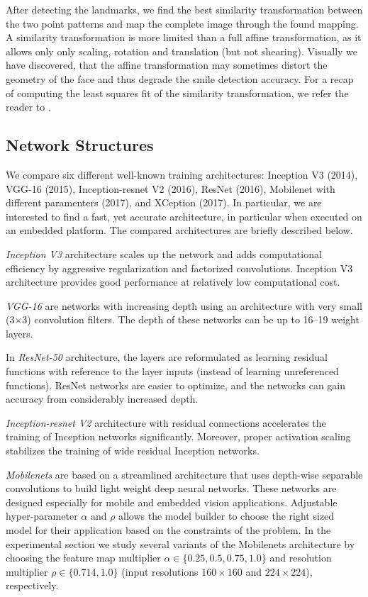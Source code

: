 \documentclass[conference]{IEEEtran}
\begin{document}
After detecting the landmarks, we find the best similarity transformation between the two point patterns and map the complete image through the found mapping. A similarity transformation is more limited than a full affine transformation, as it allows only only scaling, rotation and translation (but not shearing). Visually we have discovered, that the affine transformation may sometimes distort the geometry of the face and thus degrade the smile detection accuracy. For a recap of computing the least squares fit of the similarity transformation, we refer the reader to \cite{bai2018}.


\subsection{Network Structures}

We compare six different well-known training architectures: Inception V3 (2014), VGG-16 (2015), Inception-resnet V2 (2016), ResNet (2016), Mobilenet with different paramenters (2017), and XCeption (2017). In particular, we are interested to find a fast, yet accurate architecture, in particular when executed on an embedded platform. The compared architectures are briefly described below.

\textit{Inception V3} \cite{inceptionv3} architecture scales up the network and adds computational efficiency by aggressive regularization and factorized convolutions. Inception V3 architecture provides good performance at relatively low computational cost.

\textit{VGG-16} \cite{vgg} are networks with increasing depth using an architecture with very small (3$\times$3) convolution filters. The depth of these networks can be up to 16--19 weight layers.

In \textit{ResNet-50} \cite{resnet} architecture, the layers are reformulated as learning residual functions with reference to the layer inputs (instead of learning unreferenced functions). ResNet networks are easier to optimize, and the networks can gain accuracy from considerably increased depth.

\textit{Inception-resnet V2} \cite{inc-resnet} architecture with residual connections accelerates the training of Inception networks significantly. Moreover, proper activation scaling stabilizes the training of wide residual Inception networks.

\textit{Mobilenets} \cite{mobilenets} are based on a streamlined architecture that uses depth-wise separable convolutions to build light weight deep neural networks. These networks are designed especially for mobile and embedded vision applications. Adjustable hyper-parameter $\alpha$ and $\rho$ allows the model builder to choose the right sized model for their application based on the constraints of the problem.
In the experimental section we study several variants of the Mobilenets architecture by choosing the feature map multiplier $\alpha \in \{0.25, 0.5, 0.75, 1.0\}$ and resolution multiplier $\rho \in \{0.714, 1.0\}$ (input resolutions $160\times 160$ and $224\times 224$), respectively.
\end{document}
